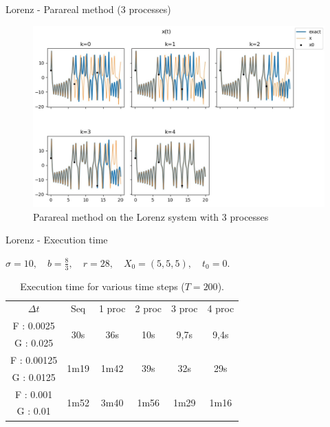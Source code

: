 	\begin{frame}{Lorenz - Parareal method (3 processes)}

	\begin{minipage}{\linewidth}
	\begin{figure}
		\centering       
		\includegraphics[width=0.7\linewidth]{"images/parareal/lorenz_3p.jpg"}
		\caption{Parareal method on the Lorenz system with 3 processes}
	\end{figure}
	\end{minipage}
	
	\end{frame}
	\begin{frame}{Lorenz - Execution time}

	$\sigma=10, \quad b=\frac{8}{3}, \quad r=28, \quad X_0=(5,5,5), \quad t_0=0.$
	\begin{table}[H]
		\centering
		\begin{tabular}{| c || c | c | c | c | c |}
			\hline
			\multirow{2}{1.5 cm}{$\Delta t$} & \multirow{2}{1.5 cm}{Seq} & \multirow{2}{1.5 cm}{1 proc} & \multirow{2}{1.5 cm}{2 proc} & \multirow{2}{1.5 cm}{3 proc} &\multirow{2}{1.5 cm}{4 proc} \\
			& & & & & \\
			\hline 
			F : 0.0025 & \multirow{2}{1.5 cm}{30s} & \multirow{2}{1.5 cm}{36s} & \multirow{2}{1.5 cm}{10s} & \multirow{2}{1.5 cm}{9,7s} & \multirow{2}{1.5 cm}{9,4s} \\
			G : 0.025 & & & & & \\
			\hline 
			F : 0.00125 & \multirow{2}{1.5 cm}{1m19} & \multirow{2}{1.5 cm}{1m42} & \multirow{2}{1.5 cm}{39s} & \multirow{2}{1.5 cm}{32s} & \multirow{2}{1.5 cm}{29s} \\
			G : 0.0125 & & & & & \\
			\hline 
			F : 0.001 & \multirow{2}{1.5 cm}{1m52} & \multirow{2}{1.5 cm}{3m40} & \multirow{2}{1.5 cm}{1m56} & \multirow{2}{1.5 cm}{1m29} & \multirow{2}{1.5 cm}{1m16} \\
			G : 0.01 & & & & & \\	 
			\hline
		\end{tabular}
		\caption{Execution time for various time steps ($T=200$).}
		\label{time}
	\end{table}

\end{frame}